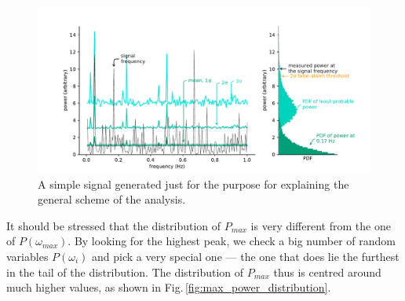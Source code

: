 \begin{figure}
  \centering \includegraphics[width=\linewidth]{gfx/axions/basic_detection.pdf}
  \caption{A simple signal generated just for the purpose for explaining the general scheme of the analysis.}
  \label{fig:basic_detection}
\end{figure}


It should be stressed that the distribution of $P_{max}$ is very different from the one of $P(\omega_{max})$. By looking for the highest peak, we check a big number of random variables $P(\omega_i)$ and pick a very special one --- the one that does lie the furthest in the tail of the distribution. The distribution of $P_{max}$ thus is centred around much higher values, as shown in Fig.\,\ref{fig:max_power_distribution}.

